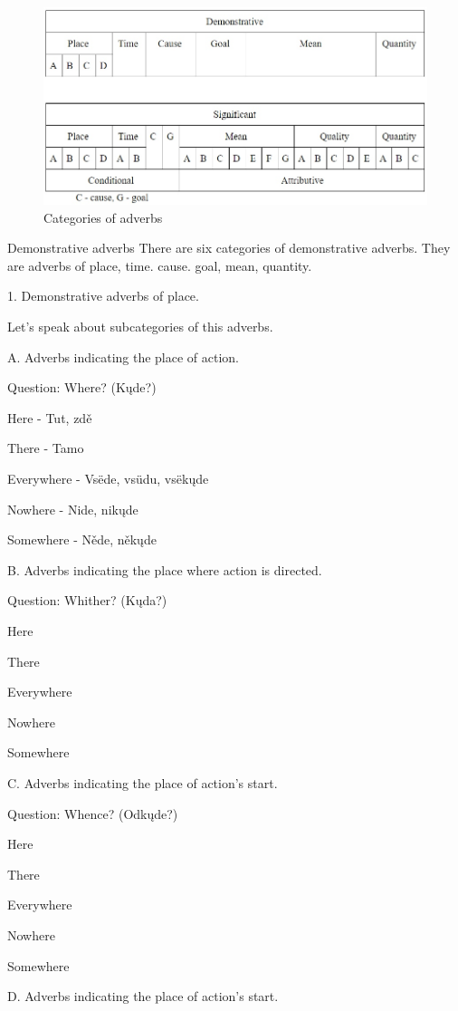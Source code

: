 \begin{figure}
	\includegraphics[width=\linewidth]{./sources/adverbs.jpg}
	\caption{Categories of adverbs}
	\label{fig:adverbs}
\end{figure}

Demonstrative adverbs
There are six categories of demonstrative adverbs. They are adverbs of place, time. cause. goal, mean, quantity.

1. Demonstrative adverbs of place.

Let’s speak about subcategories of this adverbs. 

A. Adverbs indicating the place of action.

Question: Where? (Kųde?)

Here - Tut, zdě

There - Tamo

Everywhere - Vsëde, vsüdu, vsëkųde

Nowhere - Nide, nikųde

Somewhere - Něde, někųde

B. Adverbs indicating the place where action is directed. 

Question: Whither? (Kųda?)

Here

There

Everywhere

Nowhere

Somewhere


C. Adverbs indicating the place of action’s start.

Question: Whence? (Odkųde?)

Here

There

Everywhere

Nowhere

Somewhere


D. Adverbs indicating the place of action’s start.

